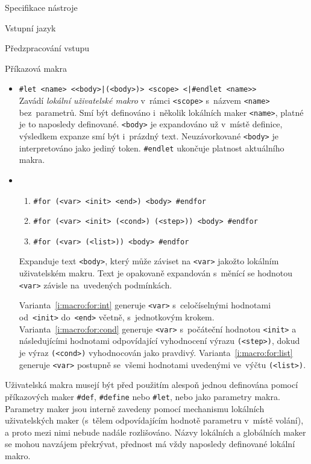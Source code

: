 \documentclass[thesis=M,czech]{FITthesis}[2012/06/26]
\newcommand{\id}[1]{\texttt{#1}}
\newcommand{\hl}[1]{\textit{#1}}
\newcommand{\rf}[1]{\ref{#1}}
\begin{document}
\begin{section}{Specifikace nástroje}
\begin{subsection}{Vstupní jazyk}
\begin{subsubsection}{Předzpracování vstupu}
\begin{paragraph}{Příkazová makra}
\begin{itemize}
   Ve~variantě~\rf{i:macro:def:def} může být tělo i~víceřádkové;
   varianta~\rf{i:macro:def:define} je zakončena koncem řádku.
\item \id{\#let <name> <{}<body>|(<body>)> <scope> <|\#endlet <name>{}>} \\
   Zavádí \hl{lokální uživatelské makro}
   v~rámci \id{<scope>} s~názvem \id{<name>}
   bez~parametrů. Smí být definováno i~několik lokálních maker \id{<name>},
   platné je to naposledy definované.
   \id{<body>} je expandováno už v~místě definice,
   výsledkem expanze smí být i~prázdný text.
   Neuzávorkované \id{<body>} je interpretováno jako jediný token.
   \id{\#endlet} ukončuje platnost aktuálního makra.
\item
   \begin{enumerate}
   \item \label{i:macro:for:int}
      \id{\#for (<var> <init> <end>) <body> \#endfor}
   \item \label{i:macro:for:cond}
      \id{\#for (<var> <init> (<cond>) (<step>)) <body> \#endfor}
   \item \label{i:macro:for:list}
      \id{\#for (<var> (<list>)) <body> \#endfor}
   \end{enumerate}
   Expanduje text \id{<body>}, který může záviset na \id{<var>}
   jakožto lokálním uživatelském makru.
   Text je opakovaně expandován s~měnící se hodnotou \id{<var>}
   závisle na~uvedených podmínkách.

   Varianta~\rf{i:macro:for:int} generuje \id{<var>}
   s~celočíselnými hodnotami od~\id{<init>} do~\id{<end>} včetně,
   s~jednotkovým krokem.
   Varianta~\rf{i:macro:for:cond} generuje \id{<var>}
   s~počáteční hodnotou \id{<init>} a následujícími hodnotami
   odpovídající vyhodnocení výrazu \id{(<step>)},
   dokud je výraz \id{(<cond>)} vyhodnocován jako pravdivý.
   Varianta~\rf{i:macro:for:list} generuje \id{<var>}
   postupně se~všemi hodnotami uvedenými ve~výčtu \id{(<list>)}.
\end{itemize}
\end{paragraph} %


\begin{paragraph}{Uživatelská makra}
\label{p:design:spec:ilang:macros:user}
musejí být před použitím alespoň jednou definována
pomocí příkazových maker \id{\#def}, \id{\#define} nebo \id{\#let},
nebo jako parametry makra.
Parametry maker jsou interně zavedeny pomocí mechanismu
lokálních uživatelských maker
(s~tělem odpovídajícím hodnotě parametru v~místě volání),
a proto mezi nimi
nebude nadále rozlišováno.
Názvy lokálních a globálních maker se mohou navzájem překrývat,
přednost má vždy naposledy definované lokální makro.


\end{paragraph}
\end{subsubsection}
\end{subsection}
\end{section}
\end{document}
